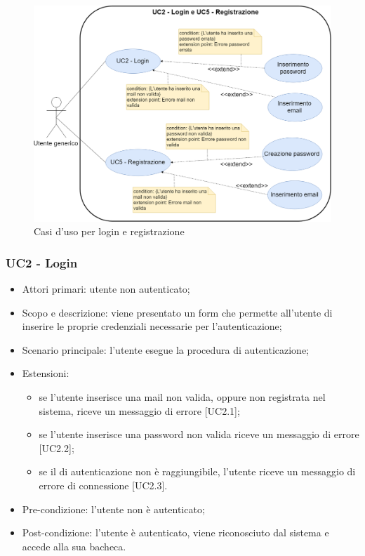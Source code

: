\begin{figure}[H]
	\centering
	\includegraphics[width=15cm,keepaspectratio]{../includes/pics/login_e_registrazione.png}
	\caption{\label{fig:mission}Casi d'uso per login e registrazione}
\end{figure}

\subsubsection{UC2 - Login}
\begin{itemize}
	\item  Attori primari: utente non autenticato;
	\item  Scopo e descrizione: viene presentato un form che permette all'utente di inserire le proprie credenziali necessarie per l'autenticazione;
	\item  Scenario principale: l'utente esegue la procedura di autenticazione;
	\item  Estensioni:
		   \begin{itemize}
				\item se l'utente inserisce una mail non valida, oppure non registrata nel sistema, riceve un messaggio di errore [UC2.1];
				\item se l'utente inserisce una password non valida riceve un messaggio di errore [UC2.2];
				\item se il  di autenticazione non è raggiungibile, l'utente riceve un messaggio di errore di connessione [UC2.3].
		   \end{itemize}
	\item  Pre-condizione: l'utente non è autenticato;
	\item  Post-condizione: l'utente è autenticato, viene riconosciuto dal sistema e accede alla sua bacheca.
\end{itemize}

